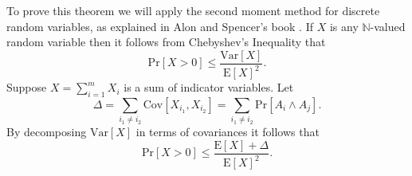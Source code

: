 \documentclass[11pt]{amsart}
\theoremstyle{definition}
\theoremstyle{remark}
\def\NN{\ensuremath{\mathbb{N}}}
\def\Pr{\ensuremath{\mathrm{Pr}}}
\def\Var{\ensuremath{\mathrm{Var}}}
\def\Cov{\ensuremath{\mathrm{Cov}}}
\def\EE{\ensuremath{\mathrm{E}}}
\begin{document}
To prove this theorem we will apply the second moment method for discrete random variables, as explained in Alon and Spencer's book \cite[\S 4.3]{AlSp}. If $X$ is any $\NN$-valued random variable then it follows from Chebyshev's Inequality that
\[ \Pr[X > 0] \leq \frac{\Var[X]}{\EE[X]^2}.\]
Suppose $X = \sum_{i=1}^m X_i$ is a sum of indicator variables. Let 
\[ \Delta = \sum_{i_1 \neq i_2} \Cov[X_{i_1}, X_{i_2}] = \sum_{i_1 \neq i_2} \Pr[A_i \land A_j] .\]
By decomposing $\Var[X]$ in terms of covariances it follows that
\begin{equation}
  \Pr[X > 0] \leq \frac{\EE[X]+ \Delta}{\EE[X]^2}. \label{eq:Delta}
\end{equation}
\end{document}
